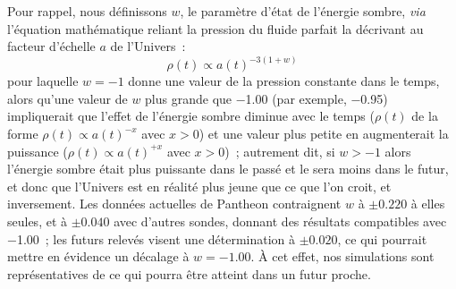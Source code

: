 \documentclass[../main/main.tex]{subfiles}
\begin{document}
Pour rappel, nous définissons $w$, le paramètre d'état de l'énergie sombre,
\textit{via} l'équation mathématique reliant la pression du fluide parfait la
décrivant au facteur d'échelle $a$ de l'Univers~:
\begin{equation}
    \rho(t) \propto a(t)^{-3(1+w)}
\end{equation}
pour laquelle $w = -1$ donne une valeur de la pression constante dans le temps,
alors qu'une valeur de $w$ plus grande que \num{-1.00} (par exemple,
\num{-0.95}) impliquerait que l'effet de l'énergie sombre diminue avec le temps
($\rho(t)$ de la forme $\rho(t) \propto a(t)^{-x}$ avec $x > 0$) et une valeur
plus petite en augmenterait la puissance ($\rho(t) \propto a(t)^{+x}$ avec $x >
0$)~; autrement dit, si $w > -1$ alors l'énergie sombre était plus puissante
dans le passé et le sera moins dans le futur, et donc que l'Univers est en
réalité plus jeune que ce que l'on croit, et inversement. Les données actuelles
de Pantheon \citep{scolnic2018} contraignent $w$ à $\pm \num{0.220}$ à elles
seules, et à $\pm \num{0.040}$ avec d'autres sondes, donnant des résultats
compatibles avec \num{-1.00}~; les futurs relevés visent une détermination à
$\pm \num{0.020}$, ce qui pourrait mettre en évidence un décalage à $w =
\num{-1.00}$. À cet effet, nos simulations sont représentatives de ce qui pourra
être atteint dans un futur proche.

\end{document}
